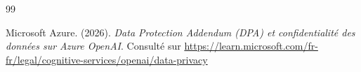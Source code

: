\clearpage
{}
\renewcommand{\bibname}{Webographie}
\begin{thebibliography}{99}
\pagestyle{noheaderpagenum}
\thispagestyle{noheaderpagenum}
    \setcounter{enumiv}{\value{lastbibitem}}
    
    Microsoft Azure. (2026). \textit{Data Protection Addendum (DPA) et confidentialité des données sur Azure OpenAI}. Consulté sur \url{https://learn.microsoft.com/fr-fr/legal/cognitive-services/openai/data-privacy}

\end{thebibliography}
\pagestyle{fancy}